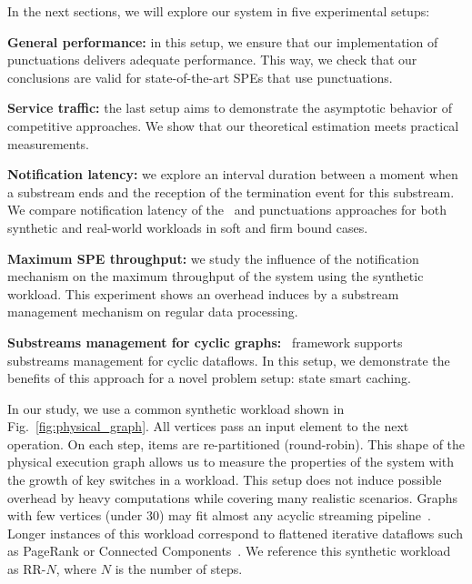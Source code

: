 In the next sections, we will explore our system in five experimental setups:
    
    \noindent \textbf{General performance:} in this setup, we ensure that our implementation of punctuations delivers adequate performance. This way, we check that our conclusions are valid for state-of-the-art SPEs that use punctuations. 
    
    \noindent \textbf{Service traffic:} the last setup aims to demonstrate the asymptotic behavior of competitive approaches. We show that our theoretical estimation meets practical measurements.
    
    \noindent \textbf{Notification latency:} we explore an interval duration between a moment when a substream ends and the reception of the termination event for this substream. We compare notification latency of the \tracker\ and punctuations approaches for both synthetic and real-world workloads in soft and firm bound cases.
    
    \noindent \textbf{Maximum SPE throughput:} we study the influence of the notification mechanism on the maximum throughput of the system using the synthetic workload. This experiment shows an overhead induces by a substream management mechanism on regular data processing.
    
    \noindent \textbf{Substreams management for cyclic graphs:} \tracker\ framework supports substreams management for cyclic dataflows. In this setup, we demonstrate the benefits of this approach for a novel problem setup: state smart caching.


In our study, we use a common synthetic workload shown in Fig.~\ref{fig:physical_graph}. All vertices pass an input element to the next operation. On each step, items are re-partitioned (round-robin). This shape of the physical execution graph allows us to measure the properties of the system with the growth of key switches in a workload. This setup does not induce possible overhead by heavy computations while covering many realistic scenarios. Graphs with few vertices (under 30) may fit almost any acyclic streaming pipeline~\cite{akidau2018streaming}. Longer instances of this workload correspond to flattened iterative dataflows such as PageRank or Connected Components~\cite{Murray:2013:NTD:2517349.2522738, xu2016efficient}. We reference this synthetic workload as RR-$N$, where $N$ is the number of steps.


